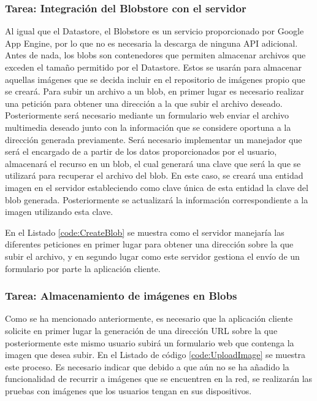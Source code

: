 \subsubsection{Tarea: Integración del Blobstore con el servidor}

Al igual que el Datastore, el Blobstore es un servicio proporcionado por Google App Engine, por lo que no es necesaria la descarga de ninguna \ac{API} adicional. Antes de nada, los blobs son contenedores que permiten almacenar archivos que exceden el tamaño permitido por el Datastore. Estos se usarán para almacenar aquellas imágenes que se decida incluir en el repositorio de imágenes propio que se creará. Para subir un archivo a un blob, en primer lugar es necesario realizar una petición para obtener una dirección a la que subir el archivo deseado. Posteriormente será necesario mediante un formulario web enviar el archivo multimedia deseado junto con la información que se considere oportuna a la dirección generada previamente. Será necesario implementar un manejador que será el encargado de a partir de los datos proporcionados por el usuario, almacenará el recurso en un blob, el cual generará una clave que será la que se utilizará para recuperar el archivo del blob. En este caso, se creará una entidad imagen en el servidor estableciendo como clave única de esta entidad la clave del blob generada. Posteriormente se actualizará la información correspondiente a la imagen utilizando esta clave.


En el Listado \ref{code:CreateBlob} se muestra como el servidor manejaría las diferentes peticiones en primer lugar para obtener una dirección sobre la que subir el archivo, y en segundo lugar como este servidor gestiona el envío de un formulario por parte la aplicación cliente.\\




\subsubsection{Tarea: Almacenamiento de imágenes en Blobs}

Como se ha mencionado anteriormente, es necesario que la aplicación cliente solicite en primer lugar la generación de una dirección \acs{URL} sobre la que posteriormente este mismo usuario subirá un formulario web que contenga la imagen que desea subir. En el Listado de código \ref{code:UploadImage} se muestra este proceso. Es necesario indicar que debido a que aún no se ha añadido la funcionalidad de recurrir a imágenes que se encuentren en la red, se realizarán las pruebas con imágenes que los usuarios tengan en sus dispositivos.\\

